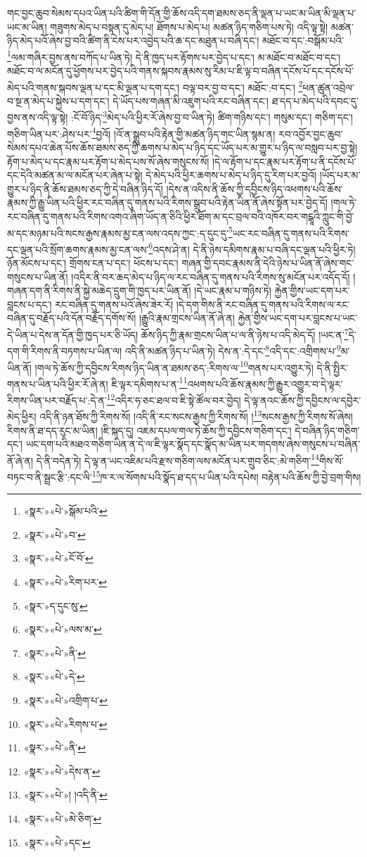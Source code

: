 གང་བྱང་ཆུབ་སེམས་དཔའ་ཡིན་པའི་ཚིག་གི་དོན་གྱི་ཆོས་འདི་དག་ཐམས་ཅད་ནི་ལྡན་པ་ཡང་མ་ཡིན་མི་ལྡན་པ་ཡང་མ་ཡིན། གཟུགས་མེད་པ་བསྟན་དུ་མེད་པ། ཐོགས་པ་མེད་པ། མཚན་ཉིད་གཅིག་པས་ཏེ། འདི་ལྟ་སྟེ། མཚན་ཉིད་མེད་པའོ་ཞེས་བྱ་བའི་ཚིག་ནི་ངེས་པར་འབྱེད་པའི་ཆ་དང་མཐུན་པ་བཞི་དང་། མཐོང་བ་དང་:བསྒོམ་པའི་\footnote{«སྣར་»«པེ་»སྒོམ་པའི་}ལམ་གཞིར་བྱས་ནས་བཀོད་པ་ཡིན་ཏེ། དེ་ནི་ཁྱད་པར་རྟོགས་པར་བྱེད་པ་དང་། མ་མཐོང་བ་མཐོང་བ་དང་། མཐོང་བ་ལ་མངོན་དུ་ཕྱོགས་པར་བྱེད་པའི་གནས་སྐབས་རྣམས་སུ་རིམ་པ་ཇི་ལྟ་བ་བཞིན་དངོས་པོ་དང་དངོས་པོ་མེད་པའི་གནས་སྐབས་ལྡན་པ་དང་མི་ལྡན་པ་དག་དང་། བལྟ་བར་བྱ་བ་དང་། མཐོང་:བ་དང་། \footnote{«སྣར་»«པེ་»བ་}ཕན་ཚུན་འབྲེལ་བ་སྔ་ན་མེད་པ་སྐྱེས་པ་དག་དང་། དེ་ཡོད་པས་གཞན་མི་འཇུག་པའི་རང་བཞིན་དང་། ཐ་དད་པ་མེད་པའི་དབང་དུ་བྱས་ནས་འདི་ལྟ་སྟེ། :ངོ་བོ་ཉིད་\footnote{«སྣར་»«པེ་»ངོ་བོ་}མེད་པའི་ཕྱིར་རོ་ཞེས་བྱ་བ་ཡིན་ཏེ། ཚིག་གཉིས་དང་། གསུམ་དང་། གཅིག་དང་། གཅིག་ཡིན་པར་:ཤེས་པར་\footnote{«སྣར་»«པེ་»རིག་པར་}བྱའོ། །འོ་ན་སྒྲུབ་པའི་རྟེན་གྱི་མཚན་ཉིད་གང་ཡིན་སྙམ་ན། རབ་འབྱོར་བྱང་ཆུབ་སེམས་དཔའ་ཆེན་པོས་ཆོས་ཐམས་ཅད་ཀྱི་ཆགས་པ་མེད་པ་ཉིད་དང་ཡོད་པར་མ་གྱུར་པ་ཉིད་ལ་བསླབ་པར་བྱ་སྟེ། རྟོག་པ་མེད་པ་དང་རྣམ་པར་རྟོག་པ་མེད་པས་སོ་ཞེས་གསུངས་སོ། །དེ་ལ་རྟོག་པ་དང་རྣམ་པར་རྟོག་པ་ནི་དངོས་པོ་དང་དེའི་མཚན་མ་ལ་མངོན་པར་ཞེན་པ་སྟེ། དེ་མེད་པའི་ཕྱིར་ཆགས་པ་མེད་པ་ཉིད་དུ་རིག་པར་བྱའོ། །ཡོད་པར་མ་གྱུར་པ་ཉིད་ནི་ཆོས་ཐམས་ཅད་ཀྱི་དེ་བཞིན་ཉིད་དོ། །དེས་ན་འདིས་ནི་ཆོས་ཀྱི་དབྱིངས་ཉིད་འཕགས་པའི་ཆོས་རྣམས་ཀྱི་རྒྱུ་ཡིན་པའི་ཕྱིར་རང་བཞིན་དུ་གནས་པའི་རིགས་སྒྲུབ་པའི་རྟེན་ཡིན་ནོ་ཞེས་སྟོན་པར་བྱེད་དོ། །གལ་ཏེ་རང་བཞིན་དུ་གནས་པའི་རིགས་འགའ་ཞིག་ཡོད་ན་ཅིའི་ཕྱིར་ཐོག་མ་དང་བྲལ་བའི་འཁོར་བར་གངྒཱའི་ཀླུང་གི་བྱེ་མ་དང་མཉམ་པའི་སངས་རྒྱས་རྣམས་མྱ་ངན་ལས་འདས་ཀྱང་:ད་དུང་དུ་\footnote{«སྣར་»ད་དུང་སུ་}ཡང་རང་བཞིན་དུ་གནས་པའི་རིགས་དང་ལྡན་པའི་སྲོག་ཆགས་རྣམས་མྱ་ངན་ལས་\footnote{«སྣར་»«པེ་»ལས་མ་}འདས་ཤེ་ན། དེ་ནི་ཉེས་དམིགས་རྣམ་པ་བཞི་དང་ལྡན་པའི་ཕྱིར་ཏེ། ཉོན་མོངས་པ་དང་། གྲོགས་ངན་པ་དང་། ཕོངས་པ་དང་། གཞན་གྱི་དབང་རྣམས་ནི་དེའི་ཉེས་པ་ཡིན་ནོ་ཞེས་གང་གསུངས་པ་ཡིན་ནོ། །འདིར་ནི་བར་ཆད་མེད་པ་ཉིད་ལ་རང་བཞིན་དུ་གནས་པའི་རིགས་སུ་མངོན་པར་འདོད་དོ། །གཞན་དག་ནི་རིགས་ནི་སྐྱེ་མཆེད་དྲུག་གི་ཁྱད་པར་ཡིན་ནོ། །དེ་ཡང་རྣམ་པ་གཉིས་ཏེ། རྐྱེན་གྱིས་ཡང་དག་པར་བླངས་པ་དང་། རང་བཞིན་དུ་གནས་པའོ་ཞེས་ཟེར་རོ། །དེ་དག་གིས་ནི་རང་བཞིན་དུ་གནས་པའི་རིགས་ལ་རང་བཞིན་དུ་བརྗོད་པའི་དོན་བརྗོད་དགོས་སོ། །རྒྱུའི་རྣམ་གྲངས་ཡིན་ནོ་ཞེ་ན། རྐྱེན་གྱིས་ཡང་དག་པར་བླངས་པ་ཡང་དེ་ཡིན་པ་དེས་ན་དོན་གྱི་ཁྱད་པར་ཅི་ཡོད། ཆོས་ཉིད་ཀྱི་རྣམ་གྲངས་ཡིན་པ་ལ་ནི་ཉེས་པ་འདི་མེད་དོ། །ཡང་ན་\footnote{«སྣར་»«པེ་»ནི་}དེ་དག་གི་རིགས་ནི་བཏགས་པ་ཡིན་ལ། འདི་ནི་མཚན་ཉིད་པ་ཡིན་ཏེ། དེས་ན་:དེ་དང་\footnote{«སྣར་»«པེ་»དེ་}འདི་དང་:འགྲིགས་པ་\footnote{«སྣར་»«པེ་»འགྲིག་པ་}མ་ཡིན་ནོ། །གལ་ཏེ་ཆོས་ཀྱི་དབྱིངས་རིགས་ཉིད་ཡིན་ན་ཐམས་ཅད་:རིགས་ལ་\footnote{«སྣར་»«པེ་»རིགས་པ་}གནས་པར་འགྱུར་ཏེ། དེ་ནི་སྤྱིར་གནས་པ་ཡིན་པའི་ཕྱིར་རོ་ཞེ་ན། ཇི་ལྟར་དམིགས་པ་ན་\footnote{«སྣར་»«པེ་»ནི་}འཕགས་པའི་ཆོས་རྣམས་ཀྱི་རྒྱུར་འགྱུར་བ་དེ་ལྟར་རིགས་ཡིན་པར་བརྗོད་པ་:དེ་ན་\footnote{«སྣར་»«པེ་»དེས་ན་}འདིར་ཧ་ཅང་ཐལ་བ་ཇི་སྟེ་ཚོལ་བར་བྱེད། དེ་ལྟ་ནའང་ཆོས་ཀྱི་དབྱིངས་ལ་དབྱེར་མེད་ཕྱིར། འདི་ནི་ཉན་ཐོས་ཀྱི་རིགས་སོ། །འདི་ནི་རང་སངས་རྒྱས་ཀྱི་རིགས་སོ། །\footnote{«སྣར་»«པེ་»། །འདི་ནི་}སངས་རྒྱས་ཀྱི་རིགས་སོ་ཞེས། རིགས་ནི་ཐ་དད་རུང་མ་ཡིན། །ཇི་སྐད་དུ། འཇམ་དཔལ་གལ་ཏེ་ཆོས་ཀྱི་དབྱིངས་གཅིག་དང་། དེ་བཞིན་ཉིད་གཅིག་དང་། ཡང་དག་པའི་མཐའ་གཅིག་ཡིན་ན་དེ་ལ་ཇི་ལྟར་སྣོད་དང་སྣོད་མ་ཡིན་པར་གདགས་ཞེས་གསུངས་པ་བཞིན་ནོ་ཞེ་ན། དེ་ནི་བདེན་ཏེ། དེ་ལྟ་ན་ཡང་འཇིམ་པའི་རྫས་གཅིག་ལས་མངོན་པར་གྲུབ་ཅིང་:མེ་གཅིག་\footnote{«སྣར་»«པེ་»མེ་ཅིག་}གིས་སོ་བཏང་བ་ནི་སྦྲང་རྩི་:དང་ལི་\footnote{«སྣར་»«པེ་»དང་}ཁ་ར་ལ་སོགས་པའི་སྣོད་ཐ་དད་པ་ཡིན་པའི་དཔེས། བརྟེན་པའི་ཆོས་ཀྱི་བྱེ་བྲག་གིས། 